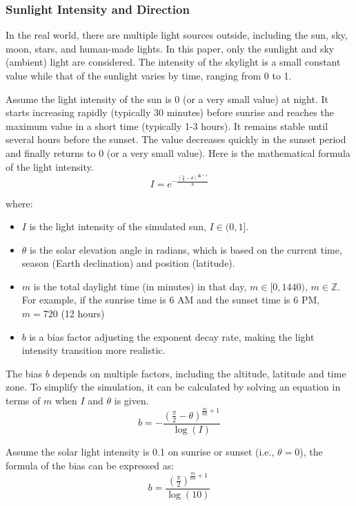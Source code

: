 \documentclass{article}
\begin{document}
\subsubsection {Sunlight Intensity and Direction}
In the real world, there are multiple light sources outside, including the sun, sky, moon, stars, and human-made lights. In this paper, 
only the sunlight and sky (ambient) light are considered. The intensity of the skylight is a small constant value while that of the 
sunlight varies by time, ranging from 0 to 1.

Assume the light intensity of the sun is 0 (or a very small value) at night. It starts increasing rapidly (typically 30 minutes) 
before sunrise and reaches the maximum value in a short time (typically 1-3 hours). It remains stable until several hours before the 
sunset. The value decreases quickly in the sunset period and finally returns to 0 (or a very small value). Here is the mathematical 
formula of the light intensity.
\[
  I = e^{-\frac{\left(\frac{\pi}{2} - \theta\right)^{\frac{m}{60} + 1}}{b}}
\]

where:
\begin{itemize}
  \item \( I \) is the light intensity of the simulated sun, \( I \in (0, 1] \).
  \item \( \theta \) is the solar elevation angle in radians, which is based on the current time, season (Earth declination) and 
  position (latitude).
  \item \( m \) is the total daylight time (in minutes) in that day, \( m \in [0, 1440) \), \( m \in \mathbb{Z} \). For example, if 
  the sunrise time is 6 AM and the sunset time is 6 PM, \( m=720 \) (12 hours)
  \item \( b \) is a bias factor adjusting the exponent decay rate, making the light intensity transition more realistic.
\end{itemize}

The bias \( b \) depends on multiple factors, including the altitude, latitude and time zone. To simplify the simulation, it can be 
calculated by solving an equation in terms of \( m \) when 
\( I \) and \( \theta\) is given.
\[
  b = -\frac{\left(\frac{\pi}{2} - \theta\right)^{\frac{m}{60} + 1}}{\log(I)}
\]

Assume the solar light intensity is 0.1 on sunrise or sunset (i.e., \( \theta=0\)), the formula of the bias can be expressed as:
\[
  b = \frac{\left(\frac{\pi}{2}\right)^{\frac{m}{60} + 1}}{\log(10)}
\]
\end{document}
